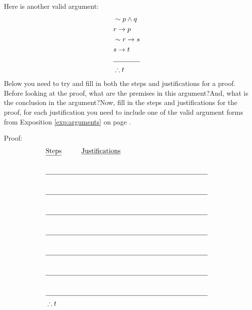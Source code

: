 \begin{practiceprob} Here is another valid argument:
    \begin{align}
        &\sim p\wedge q\\
        &r\rightarrow p\\
        &\sim r\rightarrow s\\
        & s\rightarrow t\\\cline{1-2}
        &\therefore t
    \end{align}
    Below you need to try and fill in both the steps and justifications for a proof.  Before looking at the proof, what are the premises in this argument?\vspace{4\baselineskip}\newline And, what is the conclusion in the argument?\vspace{4\baselineskip}\newline Now, fill in the steps and justifications for the proof, for each justification you need to include one of the valid argument forms from Exposition \ref{exp:arguments} on page \pageref{exp:arguments}.

    \noindent
    Proof:
    \begin{align}
        &\text{\underline{Steps}} &&\text{\underline{Justifications}}\nonumber \\
        & \phantom{\sim r \rightarrow \sim t} && \phantom{Step (??) and Step (??) and Some Logical Law}\\ \cline{1-4}
        & \phantom{\sim r \rightarrow \sim t} && \phantom{Step (??) and Step (??) and Some Logical Law}\\ \cline{1-4}
        & \phantom{\sim r \rightarrow \sim t} && \phantom{Step (??) and Step (??) and Some Logical Law}\\ \cline{1-4}
        & \phantom{\sim r \rightarrow \sim t} && \phantom{Step (??) and Step (??) and Some Logical Law}\\ \cline{1-4}
        & \phantom{\sim r \rightarrow \sim t} && \phantom{Step (??) and Step (??) and Some Logical Law}\\ \cline{1-4}
        & \phantom{\sim r \rightarrow \sim t} && \phantom{Step (??) and Step (??) and Some Logical Law}\\ \cline{1-4}
        & \phantom{\sim r \rightarrow \sim t} && \phantom{Step (??) and Step (??) and Some Logical Law}\\ \cline{1-4} 
        &\therefore t
    \end{align}    
\end{practiceprob}

